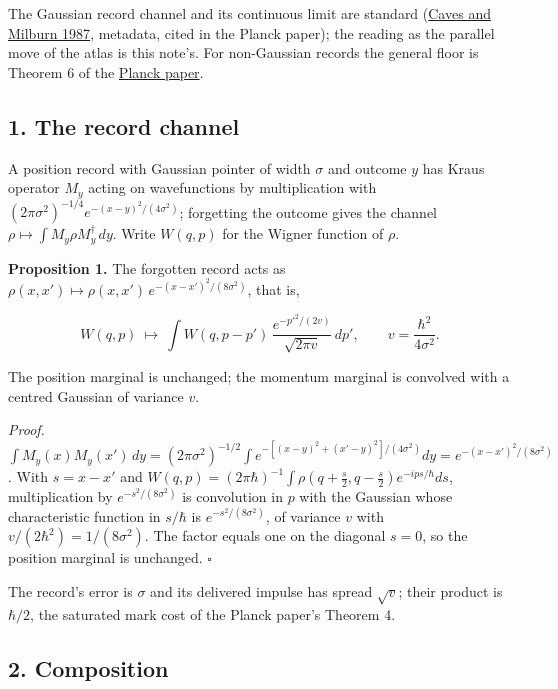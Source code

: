 \documentclass[11pt,a4paper]{article}
\begin{document}
The Gaussian record channel and its continuous limit are standard
(\href{https://doi.org/10.1103/PhysRevA.36.5543}{Caves and Milburn
1987}, metadata, cited in the Planck paper); the reading as the parallel
move of the atlas is this note's. For non-Gaussian records the general
floor is Theorem 6 of the \href{planck-gap-paper.md}{Planck paper}.

\hypertarget{the-record-channel}{%
\subsection{1. The record channel}\label{the-record-channel}}

A position record with Gaussian pointer of width \(\sigma\) and outcome
\(y\) has Kraus operator \(M_y\) acting on wavefunctions by
multiplication with \((2\pi\sigma^2)^{-1/4}e^{-(x-y)^2/(4\sigma^2)}\);
forgetting the outcome gives the channel
\(\rho\mapsto\int M_y\rho M_y^\dagger\,dy\). Write \(W(q,p)\) for the
Wigner function of \(\rho\).

\textbf{Proposition 1.} The forgotten record acts as
\(\rho(x,x')\mapsto\rho(x,x')\,e^{-(x-x')^2/(8\sigma^2)}\), that is,

\[W(q,p)\ \mapsto\ \int W(q,p-p')\,\frac{e^{-p'^2/(2v)}}{\sqrt{2\pi v}}\,dp',
\qquad v=\frac{\hbar^2}{4\sigma^2}.\]

The position marginal is unchanged; the momentum marginal is convolved
with a centred Gaussian of variance \(v\).

\emph{Proof.}
\(\int M_y(x)M_y(x')\,dy=(2\pi\sigma^2)^{-1/2}\int e^{-[(x-y)^2+(x'-y)^2]/(4\sigma^2)}dy=e^{-(x-x')^2/(8\sigma^2)}\).
With \(s=x-x'\) and
\(W(q,p)=(2\pi\hbar)^{-1}\int\rho(q+\frac s2,q-\frac s2)e^{-ips/\hbar}ds\),
multiplication by \(e^{-s^2/(8\sigma^2)}\) is convolution in \(p\) with
the Gaussian whose characteristic function in \(s/\hbar\) is
\(e^{-s^2/(8\sigma^2)}\), of variance \(v\) with
\(v/(2\hbar^2)=1/(8\sigma^2)\). The factor equals one on the diagonal
\(s=0\), so the position marginal is unchanged. \(\square\)

The record's error is \(\sigma\) and its delivered impulse has spread
\(\sqrt v\); their product is \(\hbar/2\), the saturated mark cost of
the Planck paper's Theorem 4.

\hypertarget{composition}{%
\subsection{2. Composition}\label{composition}}
\end{document}
